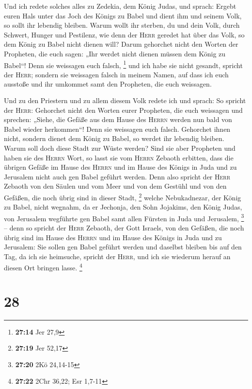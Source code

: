 Und ich redete solches alles zu Zedekia, dem König
Judas, und sprach: Ergebt euren Hals unter das Joch des Königs zu Babel
und dient ihm und seinem Volk, so sollt ihr lebendig bleiben.
 Warum wollt ihr sterben, du und dein Volk, durch
Schwert, Hunger und Pestilenz, wie denn der \textsc{Herr} geredet hat
über das Volk, so dem König zu Babel nicht dienen will? 
Darum gehorchet nicht den Worten der Propheten, die euch sagen: „Ihr
werdet nicht dienen müssen dem König zu Babel``! Denn sie weissagen euch
falsch, \footnote{\textbf{27:14} Jer 27,9}  und ich habe
sie nicht gesandt, spricht der \textsc{Herr}; sondern sie weissagen
falsch in meinem Namen, auf dass ich euch ausstoße und ihr umkommet samt
den Propheten, die euch weissagen.

 Und zu den Priestern und zu allem diesem Volk redete ich
und sprach: So spricht der \textsc{Herr}: Gehorchet nicht den Worten
eurer Propheten, die euch weissagen und sprechen: „Siehe, die Gefäße aus
dem Hause des \textsc{Herrn} werden nun bald von Babel wieder
herkommen``! Denn sie weissagen euch falsch.  Gehorchet
ihnen nicht, sondern dienet dem König zu Babel, so werdet ihr lebendig
bleiben. Warum soll doch diese Stadt zur Wüste werden? 
Sind sie aber Propheten und haben sie des \textsc{Herrn} Wort, so lasst
sie vom \textsc{Herrn} Zebaoth erbitten, dass die übrigen Gefäße im
Hause des \textsc{Herrn} und im Hause des Königs in Juda und zu
Jerusalem nicht auch gen Babel geführt werden.  Denn also
spricht der \textsc{Herr} Zebaoth von den Säulen und vom Meer und von
dem Gestühl und von den Gefäßen, die noch übrig sind in dieser Stadt,
\footnote{\textbf{27:19} Jer 52,17}  welche Nebukadnezar,
der König zu Babel, nicht wegnahm, da er Jechonja, den Sohn Jojakims,
den König Judas, von Jerusalem wegführte gen Babel samt allen Fürsten in
Juda und Jerusalem, \footnote{\textbf{27:20} 2Kö 24,14-15}
 -- denn so spricht der \textsc{Herr} Zebaoth, der Gott
Israels, von den Gefäßen, die noch übrig sind im Hause des
\textsc{Herrn} und im Hause des Königs in Juda und zu Jerusalem:
 Sie sollen gen Babel geführt werden und daselbst bleiben
bis auf den Tag, da ich sie heimsuche, spricht der \textsc{Herr}, und
ich sie wiederum herauf an diesen Ort bringen lasse. \footnote{\textbf{27:22}
  2Chr 36,22; Esr 1,7-11}

\hypertarget{section-7}{%
\section{28}\label{section-7}}

